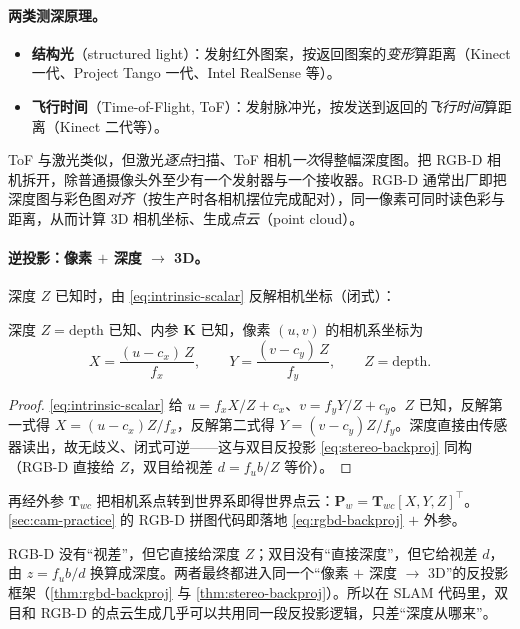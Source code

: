 \paragraph{两类测深原理。}
\begin{itemize}
  \item \textbf{结构光}（structured light）：发射红外图案，按返回图案的\emph{变形}算距离（Kinect 一代、Project Tango 一代、Intel RealSense 等）。
  \item \textbf{飞行时间}（Time-of-Flight, ToF）：发射脉冲光，按发送到返回的\emph{飞行时间}算距离（Kinect 二代等）。
\end{itemize}
ToF 与激光类似，但激光\emph{逐点}扫描、ToF 相机\emph{一次}得整幅深度图\cite{carlone2026handbook,gaoxiang2019slam14}。把 RGB-D 相机拆开，除普通摄像头外至少有一个发射器与一个接收器。RGB-D 通常出厂即把深度图与彩色图\emph{对齐}（按生产时各相机摆位完成配对），同一像素可同时读色彩与距离，从而计算 3D 相机坐标、生成\emph{点云}（point cloud）。

\paragraph{逆投影：像素 $+$ 深度 $\to$ 3D。}
深度 $Z$ 已知时，由 \cref{eq:intrinsic-scalar} 反解相机坐标（闭式）：

\begin{theorem}\label{thm:rgbd-backproj}
深度 $Z=\text{depth}$ 已知、内参 $\mathbf{K}$ 已知，像素 $(u,v)$ 的相机系坐标为
\begin{equation}
  X=\frac{(u-c_x)\,Z}{f_x},\qquad Y=\frac{(v-c_y)\,Z}{f_y},\qquad Z=\text{depth}.
  \label{eq:rgbd-backproj}
\end{equation}
\end{theorem}
\begin{proof}
\cref{eq:intrinsic-scalar} 给 $u=f_x X/Z+c_x$、$v=f_y Y/Z+c_y$。$Z$ 已知，反解第一式得 $X=(u-c_x)Z/f_x$，反解第二式得 $Y=(v-c_y)Z/f_y$。深度直接由传感器读出，故无歧义、闭式可逆——这与双目反投影 \cref{eq:stereo-backproj} 同构（RGB-D 直接给 $Z$，双目给视差 $d=f_u b/Z$ 等价）。
\end{proof}

\noindent 再经外参 $\mathbf{T}_{wc}$ 把相机系点转到世界系即得世界点云：$\mathbf{P}_w=\mathbf{T}_{wc}[X,Y,Z]^\top$。\cref{sec:cam-practice} 的 RGB-D 拼图代码即落地 \cref{eq:rgbd-backproj} $+$ 外参。

\begin{insight}
RGB-D 没有“视差”，但它直接给深度 $Z$；双目没有“直接深度”，但它给视差 $d$，由 $z=f_ub/d$ 换算成深度。两者最终都进入同一个“像素 $+$ 深度 $\to$ 3D”的反投影框架（\cref{thm:rgbd-backproj} 与 \cref{thm:stereo-backproj}）\cite{barfoot2024state}。所以在 SLAM 代码里，双目和 RGB-D 的点云生成几乎可以共用同一段反投影逻辑，只差“深度从哪来”。
\end{insight}

